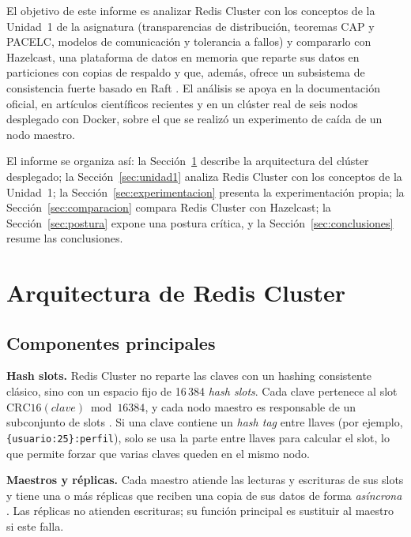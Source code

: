 \documentclass[11pt,a4paper]{article}
\begin{document}
El objetivo de este informe es analizar Redis Cluster con los conceptos de la
Unidad~1 de la asignatura (transparencias de distribución, teoremas CAP y
PACELC, modelos de comunicación y tolerancia a fallos) y compararlo con
Hazelcast, una plataforma de datos en memoria que reparte sus datos en
particiones con copias de respaldo y que, además, ofrece un subsistema de
consistencia fuerte basado en Raft \cite{hazelcast2026partitioning,
hazelcast2026cpsubsystem}. El análisis se apoya en la documentación oficial,
en artículos científicos recientes y en un clúster real de seis nodos
desplegado con Docker, sobre el que se realizó un experimento de caída de un
nodo maestro.

El informe se organiza así: la Sección~\ref{sec:arquitectura} describe la
arquitectura del clúster desplegado; la Sección~\ref{sec:unidad1} analiza
Redis Cluster con los conceptos de la Unidad~1; la
Sección~\ref{sec:experimentacion} presenta la experimentación propia; la
Sección~\ref{sec:comparacion} compara Redis Cluster con Hazelcast; la
Sección~\ref{sec:postura} expone una postura crítica, y la
Sección~\ref{sec:conclusiones} resume las conclusiones.

\section{Arquitectura de Redis Cluster}
\label{sec:arquitectura}

\subsection{Componentes principales}

\textbf{Hash slots.} Redis Cluster no reparte las claves con un hashing
consistente clásico, sino con un espacio fijo de 16\,384 \emph{hash slots}.
Cada clave pertenece al slot $\mathrm{CRC16}(\mathit{clave}) \bmod 16384$, y
cada nodo maestro es responsable de un subconjunto de slots
\cite{redis2026clusterspec}. Si una clave contiene un \emph{hash tag} entre
llaves (por ejemplo, \texttt{\{usuario:25\}:perfil}), solo se usa la parte
entre llaves para calcular el slot, lo que permite forzar que varias claves
queden en el mismo nodo.

\textbf{Maestros y réplicas.} Cada maestro atiende las lecturas y escrituras
de sus slots y tiene una o más réplicas que reciben una copia de sus datos de
forma \emph{asíncrona} \cite{redis2026replication}. Las réplicas no atienden
escrituras; su función principal es sustituir al maestro si este falla.
\end{document}
